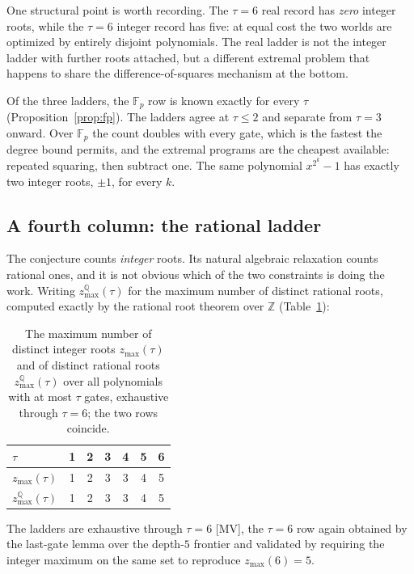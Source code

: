 \documentclass[11pt]{article}
\theoremstyle{definition}
\theoremstyle{remark}
\newcommand{\zmax}{z_{\max}}
\newcommand{\zqmax}{z^{\mathbb{Q}}_{\max}}
\begin{document}
One structural point is worth recording. The $\tau = 6$ real record has
\emph{zero} integer roots, while the $\tau = 6$ integer record has five: at
equal cost the two worlds are optimized by entirely disjoint polynomials. The
real ladder is not the integer ladder with further roots attached, but a
different extremal problem that happens to share the difference-of-squares
mechanism at the bottom.

Of the three ladders, the $\mathbb{F}_p$ row is known exactly for every $\tau$
(Proposition~\ref{prop:fp}).
The ladders agree at $\tau \le 2$ and separate from $\tau = 3$ onward. Over
$\mathbb{F}_p$ the count doubles with every gate, which is the fastest the
degree bound permits, and the extremal programs are the cheapest available:
repeated squaring, then subtract one. The same polynomial $x^{2^k}-1$ has
exactly two integer roots, $\pm 1$, for every $k$.

\subsection{A fourth column: the rational ladder}\label{sec:rational}

The conjecture counts \emph{integer} roots. Its natural algebraic relaxation
counts rational ones, and it is not obvious which of the two constraints is
doing the work. Writing $\zqmax(\tau)$ for the maximum number of distinct
rational roots, computed exactly by the rational root theorem over $\mathbb{Z}$
(Table~\ref{tab:rational}):

\begin{table}[t]
\centering
\caption{The maximum number of distinct integer roots $\zmax(\tau)$ and of distinct rational roots
$\zqmax(\tau)$ over all polynomials with at most $\tau$ gates, exhaustive through $\tau = 6$; the two rows coincide.}
\label{tab:rational}
\begin{tabular}{l|cccccc}
\toprule
$\tau$           & 1 & 2 & 3 & 4 & 5 & 6\\\midrule
$\zmax(\tau)$    & 1 & 2 & 3 & 3 & 4 & 5\\
$\zqmax(\tau)$   & 1 & 2 & 3 & 3 & 4 & 5\\
\bottomrule
\end{tabular}
\end{table}

The ladders are exhaustive through $\tau = 6$ [MV], the $\tau = 6$ row again obtained by the
last-gate lemma over the depth-$5$ frontier and validated by requiring the integer
maximum on the same set to reproduce $\zmax(6) = 5$.
\end{document}
